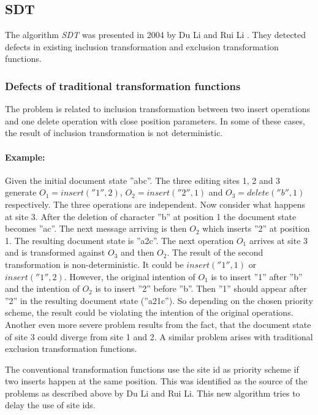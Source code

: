 \subsection{SDT}
\label{algo:sdt}

The algorithm \emph{SDT} was presented in 2004 by Du Li and Rui Li \cite{sdt}. They detected defects in existing inclusion transformation and exclusion transformation functions. 

\subsubsection{Defects of traditional transformation functions}
The problem is related to inclusion transformation between two insert operations and one delete operation with close position parameters. In some of these cases, the result of inclusion transformation is not deterministic. 

\paragraph{Example: } Given the initial document state ''abc''. The three editing sites 1, 2 and 3 generate $O_{1} = insert(''1'',2)$, $O_{2} = insert(''2'',1)$ and $O_{3} = delete(''b'',1)$ respectively. The three operations are independent. Now consider what happens at site 3. After the deletion of character ''b'' at position 1 the document state becomes ''ac''. The next message arriving is then $O_{2}$ which inserts ''2'' at position 1. The resulting document state is ''a2c''. The next operation $O_{1}$ arrives at site 3 and is transformed against $O_{3}$ and then $O_{2}$. The result of the second transformation is non-deterministic. It could be $insert(''1'',1)$ or $insert(''1'',2)$. However, the original intention of $O_{1}$ is to insert ''1'' after ''b'' and the intention of $O_{2}$ is to insert ''2'' before ''b''. Then ''1'' should appear after ''2'' in the resulting document state (''a21c''). So depending on the chosen priority scheme, the result could be violating the intention of the original operations. Another even more severe problem results from the fact, that the document state of site 3 could diverge from site 1 and 2. A similar problem arises with traditional exclusion transformation functions.

The conventional transformation functions use the site id as priority scheme if two inserts happen at the same position. This was identified as the source of the problems as described above by Du Li and Rui Li. This new algorithm tries to delay the use of site ids.


